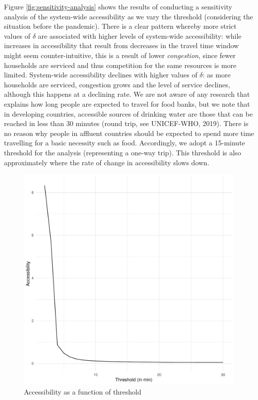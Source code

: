 \documentclass[]{elsarticle} %
\providecommand{\DIFaddbeginFL}{} %
\providecommand{\DIFaddendFL}{} %
\providecommand{\DIFdelbeginFL}{} %
\providecommand{\DIFdelendFL}{} %
\newcommand{\DIFscaledelfig}{0.5}
\newlength{\DIFdelgraphicswidth} %
\newlength{\DIFdelgraphicsheight} %
\newcommand{\DIFaddincludegraphics}[2][]{{\color{blue}\fbox{\DIFOincludegraphics[#1]{#2}}}} %
\newcommand{\DIFdelincludegraphics}[2][]{%
\sbox{\DIFdelgraphicsbox}{\DIFOincludegraphics[#1]{#2}}%
\settoboxwidth{\DIFdelgraphicswidth}{\DIFdelgraphicsbox} %
\settoboxtotalheight{\DIFdelgraphicsheight}{\DIFdelgraphicsbox} %
\scalebox{\DIFscaledelfig}{%
\parbox[b]{\DIFdelgraphicswidth}{\usebox{\DIFdelgraphicsbox}\\[-\baselineskip] \rule{\DIFdelgraphicswidth}{0em}}\llap{\resizebox{\DIFdelgraphicswidth}{\DIFdelgraphicsheight}{%
\setlength{\unitlength}{\DIFdelgraphicswidth}%
\begin{picture}(1,1)%
\thicklines\linethickness{2pt} %
{\color[rgb]{1,0,0}\put(0,0){\framebox(1,1){}}}%
{\color[rgb]{1,0,0}\put(0,0){\line( 1,1){1}}}%
{\color[rgb]{1,0,0}\put(0,1){\line(1,-1){1}}}%
\end{picture}%
}\hspace*{3pt}}} %
} %
\DeclareRobustCommand{\DIFaddbeginFL}{\DIFOaddbeginFL \let\includegraphics\DIFaddincludegraphics} %
\DeclareRobustCommand{\DIFaddendFL}{\DIFOaddendFL \let\includegraphics\DIFOincludegraphics} %
\DeclareRobustCommand{\DIFdelbeginFL}{\DIFOdelbeginFL \let\includegraphics\DIFdelincludegraphics} %
\DeclareRobustCommand{\DIFdelendFL}{\DIFOaddendFL \let\includegraphics\DIFOincludegraphics} %
\begin{document}
Figure \ref{fig:sensitivity-analysis} shows the results of conducting a
sensitivity analysis of the system-wide accessibility as we vary the
threshold (considering the situation before the pandemic). There is a
clear pattern whereby more strict values of \(\delta\) are associated
with higher levels of system-wide accessibility: while increases in
accessibility that result from decreases in the travel time window might
seem counter-intuitive, this is a result of lower \emph{congestion},
since fewer households are serviced and thus competition for the same
resources is more limited. System-wide accessibility declines with
higher values of \(\delta\): as more households are serviced, congestion
grows and the level of service declines, although this happens at a
declining rate. We are not aware of any research that explains how long
people are expected to travel for food banks, but we note that in
developing countries, accessible sources of drinking water are those
that can be reached in less than 30 minutes (round trip, see UNICEF-WHO,
2019). There is no reason why people in affluent countries should be
expected to spend more time travelling for a basic necessity such as
food. Accordingly, we adopt a 15-minute threshold for the analysis
(representing a one-way trip). This threshold is also approximately
where the rate of change in accessibility slows down.

\begin{figure}
\DIFdelbeginFL %
\DIFdelendFL \DIFaddbeginFL \includegraphics[width=0.6\linewidth]{Accessibility-Foodbanks-Hamilton_files/figure-latex/plot-results-sensitivity-analysis-1} \DIFaddendFL \caption{\label{fig:sensitivity-analysis}Accessibility as a function of threshold}\label{fig:plot-results-sensitivity-analysis}
\end{figure}
\end{document}
